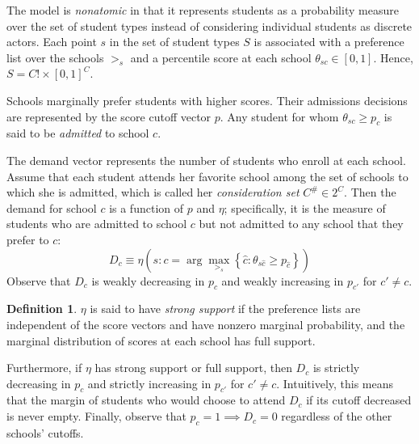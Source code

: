 \documentclass[12pt]{article}
\theoremstyle{definition}
\newtheorem{definition}{Definition}
\begin{document}
The model is \emph{nonatomic} in that it represents students as a probability measure over the set of student types instead of considering individual students as discrete actors. Each point $s$ in the set of student types $S$ is associated with a preference list over the schools $>_s$ and a percentile score at each school $\theta_{sc} \in [0,1]$. Hence, $S = C! \times [0, 1]^C$. 

Schools marginally prefer students with higher scores. Their admissions decisions are represented by the score cutoff vector $p$. Any student for whom $\theta_{sc} \geq p_c$ is said to be \emph{admitted} to school $c$. 

The demand vector represents the number of students who enroll at each school. Assume that each student attends her favorite school among the set of schools to which she is admitted, which is called her \emph{consideration set} $C^\# \in 2^C$. Then the demand for school $c$ is a function of $p$ and $\eta$; specifically, it is the measure of students who are admitted to school $c$ but not admitted to any school that they prefer to $c$:
\begin{equation} \label{demanddefinition}
D_c \equiv \eta\left(s: c = \arg \max_{>_s} \left\{\hat c: \theta_{s\hat c} \geq p_{\hat c} \right\}\right)
\end{equation}
Observe that $D_c$ is weakly decreasing in $p_c$ and weakly increasing in $p_{c'}$ for $c' \neq c$.
\begin{definition} \label{strongsupportdefinition}
$\eta$ is said to have \emph{strong support} if the preference lists are independent of the score vectors and have nonzero marginal probability, and the marginal distribution of scores at each school has full support. 
\end{definition}
Furthermore, if $\eta$ has strong support or full support, then $D_c$ is strictly decreasing in $p_c$ and strictly increasing in $p_{c'}$ for $c' \neq c$. Intuitively, this means that the margin of students who would choose to attend $D_c$ if its cutoff decreased is never empty. Finally, observe that $p_c = 1 \implies D_c = 0$ regardless of the other schools' cutoffs.
\end{document}
